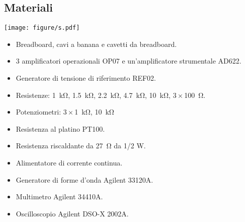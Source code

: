 \subsection{Materiali}

\begin{sidewaysfigure*}
	\texttt{[image: figure/s.pdf]}
    \caption{}
    \label{fig:circ6}
\end{sidewaysfigure*}

\begin{itemize}
    \item{Breadboard, cavi a banana e cavetti da breadboard.}
    \item{3 amplificatori operazionali OP07 e un'amplificatore strumentale AD622.}
    \item{Generatore di tensione di riferimento REF02.}
    \item{Resistenze: \SI{1}{\kilo\ohm}, \SI{1.5}{\kilo\ohm}, \SI{2.2}{\kilo\ohm}, \SI{4.7}{\kilo\ohm}, \SI{10}{\kilo\ohm}, $3 \times$\SI{100}{\ohm}.}
    \item{Potenziometri: $3 \times$\SI{1}{\kilo\ohm}, \SI{10}{\kilo\ohm}}
    \item{Resistenza al platino PT100.}
    \item{Resistenza riscaldante da \SI{27}{\ohm} da 1/2 W.}
    \item{Alimentatore di corrente continua.}
    \item{Generatore di forme d'onda Agilent 33120A.}
    \item{Multimetro Agilent 34410A.}
    \item{Oscilloscopio Agilent DSO-X 2002A.}
\end{itemize}

